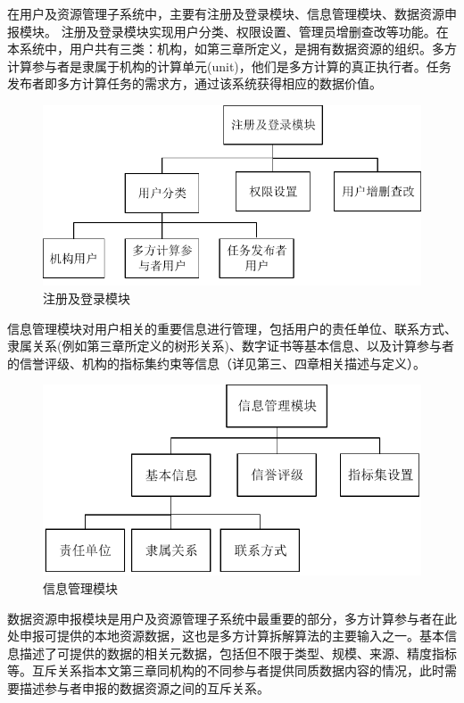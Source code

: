 \documentclass[promaster]{thesis-uestc}
\begin{document}
在用户及资源管理子系统中，主要有注册及登录模块、信息管理模块、数据资源申报模块。
注册及登录模块实现用户分类、权限设置、管理员增删查改等功能。在本系统中，用户共有三类：机构，如第三章所定义，是拥有数据资源的组织。多方计算参与者是隶属于机构的计算单元(unit)，他们是多方计算的真正执行者。任务发布者即多方计算任务的需求方，通过该系统获得相应的数据价值。

\begin{figure}[h]
    \includegraphics{pic/registerandlogin.pdf}
    \caption{注册及登录模块}
\end{figure}

信息管理模块对用户相关的重要信息进行管理，包括用户的责任单位、联系方式、隶属关系(例如第三章所定义的树形关系)、数字证书等基本信息、以及计算参与者的信誉评级、机构的指标集约束等信息（详见第三、四章相关描述与定义）。

\begin{figure}[H]
    \includegraphics{pic/information.pdf}
    \caption{信息管理模块}
\end{figure}

数据资源申报模块是用户及资源管理子系统中最重要的部分，多方计算参与者在此处申报可提供的本地资源数据，这也是多方计算拆解算法的主要输入之一。基本信息描述了可提供的数据的相关元数据，包括但不限于类型、规模、来源、精度指标等。互斥关系指本文第三章同机构的不同参与者提供同质数据内容的情况，此时需要描述参与者申报的数据资源之间的互斥关系。
\end{document}
